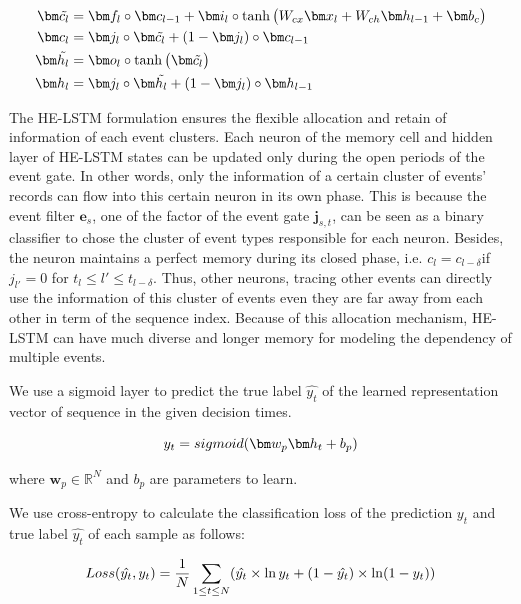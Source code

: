 \documentclass[letterpaper]{article} %
\begin{document}
\begin{align}
\setlength{\abovedisplayskip}{3pt}
\bm \tilde{c_l} &= \bm f_l \circ \bm c_{l-1} + \bm i_l \circ \tanh\big (W_{cx}\bm x_l+ W_{ch} \bm h_{l-1} + \bm b_c \big) \\
\bm c_l &= \bm j_l \circ \bm \tilde{c_l} + (1-\bm j_l) \circ \bm c_{l-1}\\
\bm \tilde{h_l} &= \bm o_l \circ \tanh \big( \bm \tilde{c_l} \big)\\
\bm h_l &= \bm j_l \circ \bm \tilde{h_l} + (1-\bm j_l) \circ \bm h_{l-1}
\setlength{\belowdisplayskip}{3pt}
\end{align}

The HE-LSTM formulation ensures
the flexible allocation and retain of information of each event clusters.
Each neuron of the memory cell and hidden layer of HE-LSTM states can be updated only during the open periods of the event gate.
In other words, only the information of a certain cluster of events' records can flow into this certain neuron in its own phase.
This is because the event filter $\bm e_s$, one of the factor of the event gate $\bm j_{s,t}$, can be seen as a binary classifier to chose the cluster of event types responsible for each neuron.
Besides, the neuron maintains a perfect memory
during its closed phase, i.e. $c_l = c_{l-\delta} $if $j_{l'} = 0$ for $ t_l \leq  l' \leq t_{l-\delta}$. Thus, other neurons, tracing other events can directly use the information of this cluster of events even they are far away from each other in term of the sequence index.
Because of this allocation mechanism, HE-LSTM can have much  diverse and longer memory for modeling the dependency of multiple events.



We use a sigmoid layer to predict the true label $\hat{y_t}$ of the  learned representation vector of sequence in the given decision times.

\begin{equation}
\setlength{\abovedisplayskip}{3pt}
y_t = sigmoid(\bm w_p  \bm h_t + b_p )
\setlength{\belowdisplayskip}{3pt}
\end{equation}


where $\bm w_p \in \mathbb{R}^N$ and $b_p$ are parameters to learn.


We use cross-entropy to calculate the classification
loss of the prediction $y_t$ and true label $\hat{y_t}$ of each sample as follows:

\begin{equation}
\setlength{\abovedisplayskip}{3pt}
Loss(\hat{y_t},y_t)
= \frac{1}{N}\sum_{1\leq t \leq N } ( \hat{y_t}\times \ln y_t  +(1-\hat{y_t})\times \ln(1-y_t))
\setlength{\belowdisplayskip}{3pt}
\end{equation}
\end{document}
